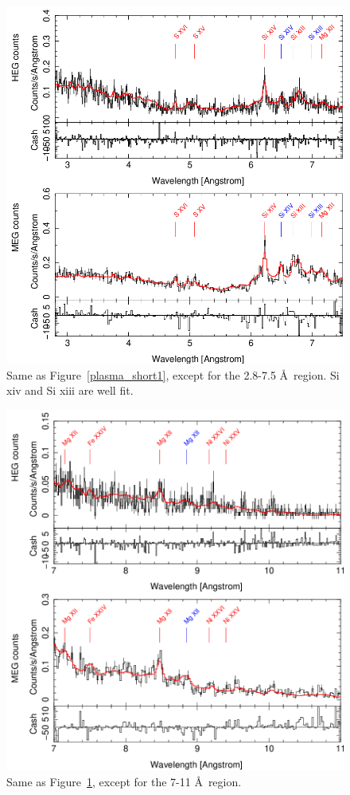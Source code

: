 \begin{figure}
    \centering
    \includegraphics[width = \linewidth]{Chapters/Figures/plasma_short2.png}
    \caption{Same as Figure~\ref{plasma_short1}, except for the 2.8-7.5 \AA\ region. Si {\sc xiv} and Si {\sc xiii} are well fit.}
    \label{plasma_short2}
\end{figure}

\begin{figure}
    \centering
    \includegraphics[width = \linewidth]{Chapters/Figures/plasma_short3.png}
    \caption{Same as Figure~\ref{plasma_short2}, except for the 7-11 \AA\ region. }
    \label{plasma_short3}
\end{figure}


